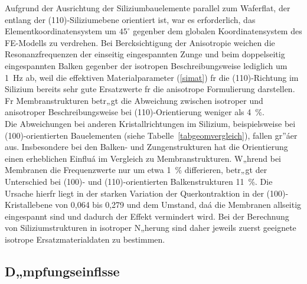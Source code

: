 Aufgrund der Ausrichtung der Siliziumbauelemente parallel
zum Waferflat, der entlang der (110)-Siliziumebene orientiert ist, war es
erforderlich, das Elementkoordinatensystem um $45^{\circ}$
gegenber dem globalen Koordinatensystem des FE-Modells zu verdrehen.
Bei Bercksichtigung der Anisotropie weichen die Resonanzfrequenzen der
einseitig eingespannten Zunge und beim doppelseitig eingespannten Balken
gegenber der isotropen Beschreibungsweise lediglich um 1~Hz ab, weil
die effektiven Materialparameter (\ref{simat}) fr die (110)-Richtung im
Silizium bereits sehr gute Ersatzwerte fr die anisotrope Formulierung
darstellen. Fr Membranstrukturen betr„gt die Abweichung zwischen
isotroper und anisotroper Beschreibungsweise bei (110)-Orientierung
weniger als 4~\%.\\
Die Abweichungen bei anderen Kristallrichtungen im Silizium, beispielsweise
bei (100)-orientierten Bauelementen (siehe Tabelle~\ref{tabgeomvergleich}),
fallen gr”áer aus. Insbesondere bei den Balken- und Zungenstrukturen hat die
Orientierung einen erheblichen Einfluá im Vergleich zu Membranstrukturen.
W„hrend bei Membranen die Frequenzwerte nur um etwa 1~\% differieren,
betr„gt der Unterschied bei (100)- und (110)-orientierten Balkenstrukturen
11~\%. Die Ursache hierfr liegt in der starken Variation der
Querkontraktion in der (100)-Kristallebene von 0,064 bis 0,279 \cite{Heu89}
und dem Umstand, daá die Membranen allseitig eingespannt sind und dadurch
der Effekt vermindert wird. Bei der Berechnung von Siliziumstrukturen
in isotroper N„herung sind daher jeweils zuerst geeignete isotrope
Ersatzmaterialdaten zu bestimmen.



\subsection{D„mpfungseinflsse}
\label{daempfungseinfluesse}

